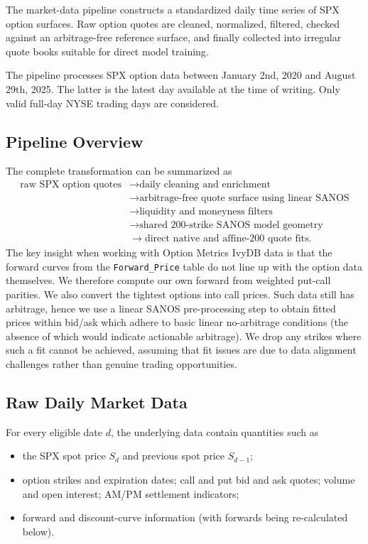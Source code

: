 \documentclass[11pt,a4paper]{article}
\begin{document}
The market-data pipeline constructs a standardized daily time series of SPX option surfaces. Raw option quotes are cleaned, normalized, filtered, checked against an arbitrage-free reference surface, and finally collected into irregular quote books suitable for direct model training.


The pipeline processes SPX option data between January 2nd, 2020 and August 29th, 2025. The latter
is the latest day available at the time of writing. Only valid full-day NYSE trading days are considered.

\subsection{Pipeline Overview}

The complete transformation can be summarized as
%
\[
\begin{aligned}
\text{raw SPX option quotes}
&\longrightarrow \text{daily cleaning and enrichment} \\
&\longrightarrow \text{arbitrage-free quote surface using linear SANOS} \\
&\longrightarrow \text{liquidity and moneyness filters} \\
&\longrightarrow \text{shared 200-strike SANOS model geometry} \\
&\longrightarrow \text{direct native and affine-200 quote fits}.
\end{aligned}
\]
The key insight when working with Option Metrics IvyDB data is that the forward curves
from the \texttt{Forward\_Price} table do not line up with the option data themselves. We therefore
compute our own forward from weighted put-call parities. We also convert the tightest options into call prices. Such data still has arbitrage, hence we use a linear SANOS pre-processing step to obtain fitted prices within bid/ask which adhere to basic linear no-arbitrage conditions (the absence of which would indicate actionable arbitrage). We drop any strikes where such a fit
cannot be achieved, assuming that fit issues are due to data alignment challenges rather than
genuine trading opportunities.

\subsection{Raw Daily Market Data}

For every eligible date \(d\), the underlying data contain quantities such as
%
\begin{itemize}
    \item the SPX spot price \(S_d\) and previous spot price \(S_{d-1}\);
    \item option strikes and expiration dates; call and put bid and ask quotes; volume and open interest; AM/PM settlement indicators;
    \item forward and discount-curve information (with forwards being re-calculated below).
\end{itemize}
\end{document}
